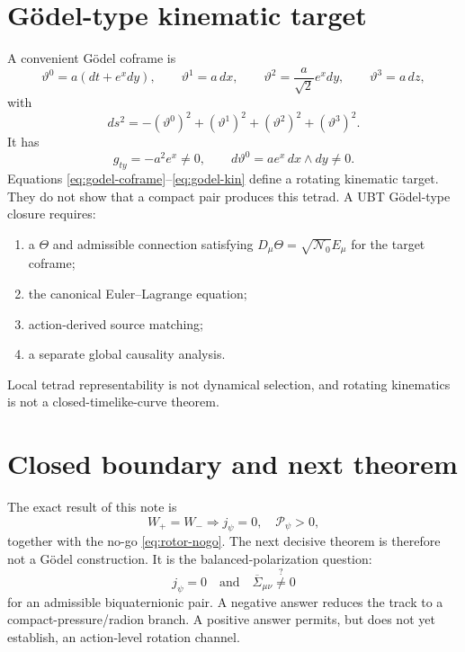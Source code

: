 \documentclass[11pt]{article}
\newcommand{\avg}[1]{\overline{#1}}
\begin{document}
\section{Gödel-type kinematic target}
A convenient Gödel coframe is
\begin{equation}
 \vartheta^0=a(dt+e^xdy),\qquad
 \vartheta^1=a\,dx,\qquad
 \vartheta^2=\frac{a}{\sqrt2}e^xdy,\qquad
 \vartheta^3=a\,dz,
 \label{eq:godel-coframe}
\end{equation}
with
\begin{equation}
 ds^2=-(\vartheta^0)^2+(\vartheta^1)^2
      +(\vartheta^2)^2+(\vartheta^3)^2.
\end{equation}
It has
\begin{equation}
 g_{ty}=-a^2e^x\neq0,
 \qquad
 d\vartheta^0=ae^x\,dx\wedge dy\neq0.
 \label{eq:godel-kin}
\end{equation}
Equations \eqref{eq:godel-coframe}--\eqref{eq:godel-kin} define a rotating
kinematic target.  They do not show that a compact pair produces this tetrad.
A UBT Gödel-type closure requires:
\begin{enumerate}
 \item a \(\Theta\) and admissible connection satisfying
       \(D_\mu\Theta=\sqrt{\mathcal N_0}E_\mu\) for the target coframe;
 \item the canonical Euler--Lagrange equation;
 \item action-derived source matching;
 \item a separate global causality analysis.
\end{enumerate}
Local tetrad representability is not dynamical selection, and rotating
kinematics is not a closed-timelike-curve theorem.

\section{Closed boundary and next theorem}
The exact result of this note is
\begin{equation}
 \boxed{
 W_+=W_-
 \Longrightarrow
 j_\psi=0,\quad \mathcal P_\psi>0,
 }
\end{equation}
together with the no-go \eqref{eq:rotor-nogo}.  The next decisive theorem is
therefore not a Gödel construction.  It is the balanced-polarization question:
\begin{equation}
 \boxed{
 j_\psi=0
 \quad\text{and}\quad
 \avg{\Sigma}_{\mu\nu}\stackrel{?}{\neq}0
 }
 \label{eq:next}
\end{equation}
for an admissible biquaternionic pair.  A negative answer reduces the track to
a compact-pressure/radion branch.  A positive answer permits, but does not yet
establish, an action-level rotation channel.
\end{document}
